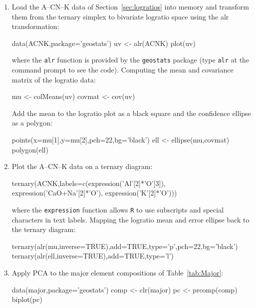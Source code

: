 \begin{enumerate}

\item Load the A--CN--K data of Section~\ref{sec:logratios} into
  memory and transform them from the ternary simplex to bivariate
  logratio space using the alr transformation:

\begin{script}
data(ACNK,package='geostats')
uv <- alr(ACNK)
plot(uv)
\end{script}

\noindent where the \texttt{alr} function is provided by the
\texttt{geostats} package (type \texttt{alr} at the command prompt to
see the code). Computing the mean and covariance matrix of the
logratio data:

\begin{script}[firstnumber=3]
mu <- colMeans(uv)
covmat <- cov(uv)
\end{script}

Add the mean to the logratio plot as a black square and the confidence
ellipse as a polygon:

\begin{script}[firstnumber=5]
points(x=mu[1],y=mu[2],pch=22,bg='black')
ell <- ellipse(mu,covmat)
polygon(ell)
\end{script}

\item Plot the A--CN--K data on a ternary diagram:

\begin{script}
ternary(ACNK,labels=c(expression('Al'[2]*'O'[3]),
                      expression('CaO+Na'[2]*'O'),
                      expression('K'[2]*'O')))
\end{script}

\noindent where the \texttt{expression} function allows \texttt{R} to
use subscripts and special characters in text labels. Mapping the
logratio mean and error ellipse back to the ternary diagram:

\begin{script}[firstnumber=4]
ternary(alr(mu,inverse=TRUE),add=TRUE,type='p',pch=22,bg='black')
ternary(alr(ell,inverse=TRUE),add=TRUE,type='l')
\end{script}

\item Apply PCA to the major element compositions of
  Table~\ref{tab:Major}:

\begin{script}[firstnumber=3]
data(major,package='geostats')
comp <- clr(major)
pc <- prcomp(comp)
biplot(pc)
\end{script}


\end{enumerate}
